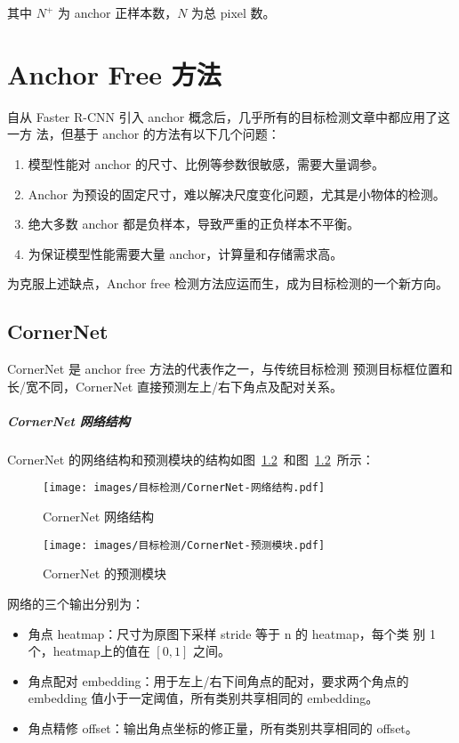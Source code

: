 其中 $N^+$ 为 anchor 正样本数，$N$ 为总 pixel 数。

\chapter{Anchor Free 方法}
自从 Faster R-CNN 引入 anchor 概念后，几乎所有的目标检测文章中都应用了这一方
法，但基于 anchor 的方法有以下几个问题：

\begin{enumerate}
  \item 模型性能对 anchor 的尺寸、比例等参数很敏感，需要大量调参。
  \item Anchor 为预设的固定尺寸，难以解决尺度变化问题，尤其是小物体的检测。
  \item 绝大多数 anchor 都是负样本，导致严重的正负样本不平衡。
  \item 为保证模型性能需要大量 anchor，计算量和存储需求高。
\end{enumerate}

为克服上述缺点，Anchor free 检测方法应运而生，成为目标检测的一个新方向。

\section{CornerNet}
\label{sec:CornerNet}
CornerNet\cite{2018-CornerNet} 是 anchor free 方法的代表作之一，与传统目标检测
预测目标框位置和长/宽不同，CornerNet 直接预测左上/右下角点及配对关系。

\paragraph{CornerNet 网络结构}
CornerNet 的网络结构和预测模块的结构如图~\ref{fig:CornerNet-network}~和图~\ref{fig:CornerNet-network}~所示：

\begin{figure}[ht]
  \centering
  \texttt{[image: images/目标检测/CornerNet-网络结构.pdf]}
  \caption{CornerNet 网络结构}
  \label{fig:CornerNet-network}
\end{figure}

\begin{figure}[ht]
  \centering
  \texttt{[image: images/目标检测/CornerNet-预测模块.pdf]}
  \caption{CornerNet 的预测模块}
  \label{fig:CornerNet-network}
\end{figure}

网络的三个输出分别为：

\begin{itemize}
  \item 角点 heatmap：尺寸为原图下采样 stride 等于 n 的 heatmap，每个类
    别 1 个，heatmap上的值在 $[0, 1]$ 之间。
  \item 角点配对 embedding：用于左上/右下间角点的配对，要求两个角点的 embedding
    值小于一定阈值，所有类别共享相同的 embedding。
  \item 角点精修 offset：输出角点坐标的修正量，所有类别共享相同的 offset。
\end{itemize}

